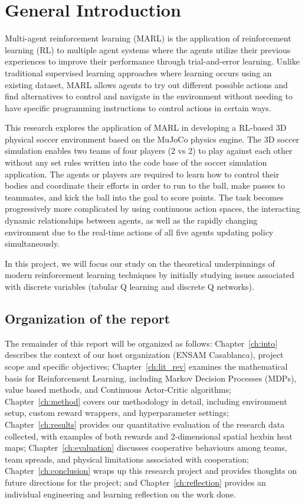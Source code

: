 \chapter*{General Introduction}
\label{ch:intoGen}

Multi-agent reinforcement learning (MARL) is the application of reinforcement learning (RL) 
to multiple agent systems where the agents utilize their previous experiences to improve 
their performance through trial-and-error learning. Unlike traditional supervised learning 
approaches where learning occurs using an existing dataset, MARL allows agents to try out 
different possible actions and find alternatives to control and navigate in the environment 
without needing to have specific programming instructions to control actions in certain ways.

This research explores the application of MARL in developing a RL-based 3D physical soccer 
environment based on the MuJoCo physics engine. The 3D soccer simulation enables two teams 
of four players (2 vs 2) to play against each other without any set rules written into the 
code base of the soccer simulation application. The agents or players are required to learn 
how to control their bodies and coordinate their efforts in order to run to the ball, make 
passes to teammates, and kick the ball into the goal to score points. The task becomes 
progressively more complicated by using continuous action spaces, the interacting dynamic 
relationships between agents, as well as the rapidly changing environment due to the 
real-time actions of all five agents updating policy simultaneously.

In this project, we will focus our study on the theoretical underpinnings of modern 
reinforcement learning techniques by initially studying issues associated with discrete 
variables (tabular Q learning and discrete Q networks).

\section*{Organization of the report}
\label{sec:intro_org}

The remainder of this report will be organized as follows: Chapter~\ref{ch:into} describes 
the context of our host organization (ENSAM Casablanca), project scope and specific objectives; 
Chapter~\ref{ch:lit_rev} examines the mathematical basis for Reinforcement Learning, including 
Markov Decision Processes (MDPs), value based methods, and Continuous Actor-Critic algorithms; 
Chapter~\ref{ch:method} covers our methodology in detail, including environment setup, custom 
reward wrappers, and hyperparameter settings; Chapter~\ref{ch:results} provides our quantitative 
evaluation of the research data collected, with examples of both rewards and 2-dimensional 
spatial hexbin heat maps; Chapter~\ref{ch:evaluation} discusses cooperative behaviours among 
teams, team spreads, and physical limitations associated with cooperation; Chapter~\ref{ch:conclusion} 
wraps up this research project and provides thoughts on future directions for the project; 
and Chapter~\ref{ch:reflection} provides an individual engineering and learning reflection 
on the work done.
